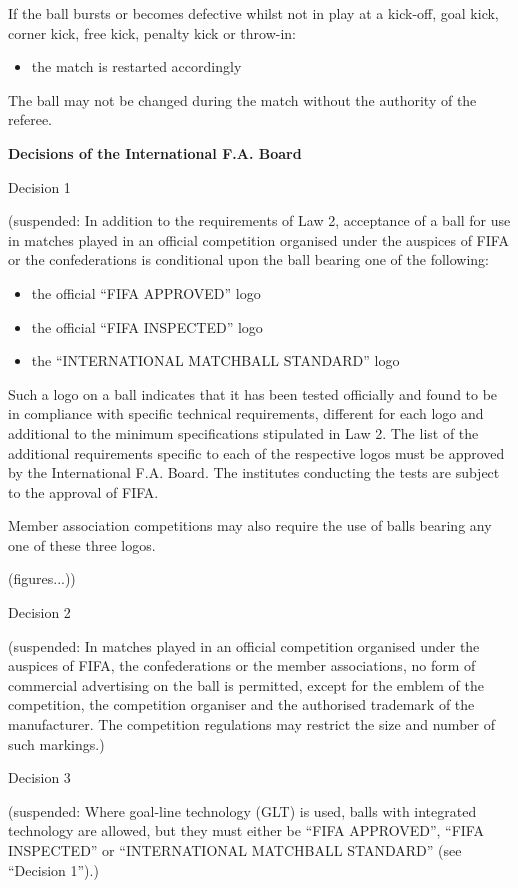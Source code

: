 If the ball bursts or becomes defective whilst not in play at a kick-off, goal kick, corner kick, free kick, penalty kick or throw-in:

\begin{itemize}
\item the match is restarted accordingly
\end{itemize}

The ball may not be changed during the match without the authority of the referee.

\clearpage

{\bfseries Decisions of the International F.A. Board}

\headlinebox

Decision 1

{\color[rgb]{0.4,0.4,0.4}
(suspended: In addition to the requirements of Law 2, acceptance of a ball for use in matches played in an official competition organised under the auspices of FIFA or the confederations is conditional upon the ball bearing one of the following: 

\begin{itemize}
\item the official ``FIFA APPROVED'' logo 
\item the official ``FIFA INSPECTED'' logo
\item the ``INTERNATIONAL MATCHBALL STANDARD'' logo
\end{itemize}

Such a logo on a ball indicates that it has been tested officially and found to be in compliance with specific technical requirements, different for each logo and additional to the minimum specifications stipulated in Law 2. The list of the additional requirements specific
to each of the respective logos must be approved by the International F.A. Board. The institutes conducting the tests are subject to the approval of FIFA.

\bigskip

Member association competitions may also require the use of balls bearing any one of these three logos.

\bigskip

(figures...))}

\bigskip

Decision 2

{\color[rgb]{0.4,0.4,0.4}
(suspended: In matches played in an official competition organised under the auspices of FIFA, the confederations or the member associations, no form of commercial advertising on the ball is permitted, except for the
emblem of the competition, the competition organiser and the authorised trademark of the manufacturer. The competition regulations may restrict the size and number of such markings.)}

\bigskip

Decision 3

{\sffamily\color[rgb]{0.4,0.4,0.4}
(suspended: Where goal-line technology (GLT) is used, balls with integrated technology are allowed, but they must either be ``FIFA APPROVED'', ``FIFA INSPECTED'' or 
``INTERNATIONAL MATCHBALL STANDARD'' (see ``Decision 1'').) }